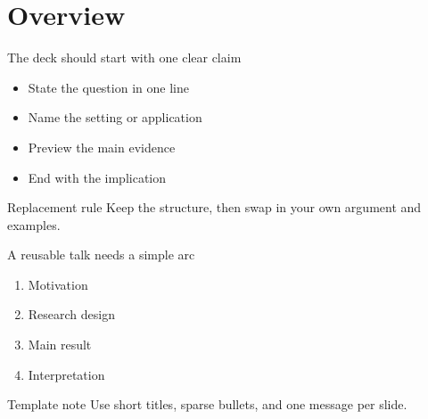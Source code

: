 \section{Overview}

\begin{frame}{The deck should start with one clear claim}
\begin{itemize}
  \setlength{\itemsep}{6pt}
  \item State the question in one line
  \item Name the setting or application
  \item Preview the main evidence
  \item End with the implication
\end{itemize}
\vfill
\begin{block}{Replacement rule}
Keep the structure, then swap in your own argument and examples.
\end{block}
\end{frame}

\begin{frame}{A reusable talk needs a simple arc}
\begin{enumerate}
  \setlength{\itemsep}{7pt}
  \item Motivation
  \item Research design
  \item Main result
  \item Interpretation
\end{enumerate}
\vfill
\begin{exampleblock}{Template note}
Use short titles, sparse bullets, and one message per slide.
\end{exampleblock}
\end{frame}
